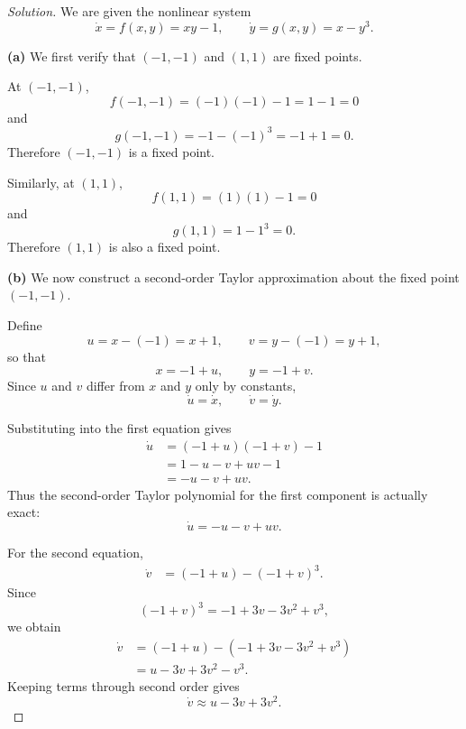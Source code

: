 \documentclass[12pt]{amsart}
\theoremstyle{conjecture}
\theoremstyle{definition}
\theoremstyle{question}
\theoremstyle{theorem}
\newenvironment{solution}
{\begin{proof}[Solution]}
{\end{proof}}
\begin{document}
    \begin{solution}
        We are given the nonlinear system
        \[
            \dot{x}=f(x,y)=xy-1,
            \qquad
            \dot{y}=g(x,y)=x-y^3.
        \]

        \textbf{(a)} We first verify that $(-1,-1)$ and $(1,1)$ are fixed
        points.

        At $(-1,-1)$,
        \[
            f(-1,-1)=(-1)(-1)-1=1-1=0
        \]
        and
        \[
            g(-1,-1)=-1-(-1)^3=-1+1=0.
        \]
        Therefore $(-1,-1)$ is a fixed point.

        Similarly, at $(1,1)$,
        \[
            f(1,1)=(1)(1)-1=0
        \]
        and
        \[
            g(1,1)=1-1^3=0.
        \]
        Therefore $(1,1)$ is also a fixed point.

        \bigskip

        \textbf{(b)} We now construct a second-order Taylor approximation
        about the fixed point $(-1,-1)$.

        Define
        \[
            u=x-(-1)=x+1,
            \qquad
            v=y-(-1)=y+1,
        \]
        so that
        \[
            x=-1+u,
            \qquad
            y=-1+v.
        \]
        Since $u$ and $v$ differ from $x$ and $y$ only by constants,
        \[
            \dot{u}=\dot{x},
            \qquad
            \dot{v}=\dot{y}.
        \]

        Substituting into the first equation gives
        \begin{align*}
            \dot{u}
            &=(-1+u)(-1+v)-1\\
            &=1-u-v+uv-1\\
            &=-u-v+uv.
        \end{align*}
        Thus the second-order Taylor polynomial for the first component is
        actually exact:
        \[
            \boxed{\dot{u}=-u-v+uv.}
        \]

        For the second equation,
        \begin{align*}
            \dot{v}
            &=(-1+u)-(-1+v)^3.
        \end{align*}
        Since
        \[
            (-1+v)^3=-1+3v-3v^2+v^3,
        \]
        we obtain
        \begin{align*}
            \dot{v}
            &=(-1+u)-(-1+3v-3v^2+v^3)\\
            &=u-3v+3v^2-v^3.
        \end{align*}
        Keeping terms through second order gives
        \[
            \boxed{\dot{v}\approx u-3v+3v^2.}
        \]


\end{solution}
\end{document}
